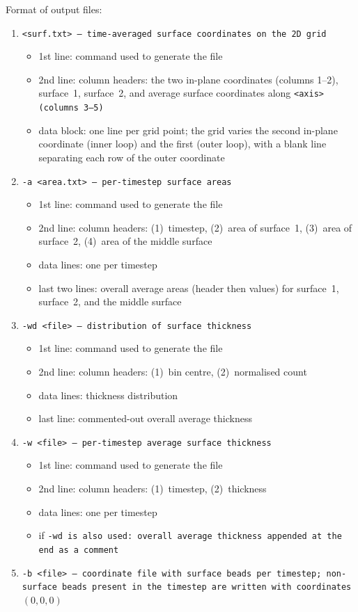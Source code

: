 \noindent
Format of output files:
\begin{enumerate}[nosep,leftmargin=20pt]
  \item \tt{<surf.txt>} --- time-averaged surface coordinates on the 2D grid
    \begin{itemize}[nosep,leftmargin=5pt]
      \item 1st line: command used to generate the file
      \item 2nd line: column headers:
        the two in-plane coordinates (columns 1--2), surface~1, surface~2,
        and average surface coordinates along \tt{<axis>} (columns 3--5)
      \item data block: one line per grid point; the grid varies the second
        in-plane coordinate (inner loop) and the first (outer loop), with a
        blank line separating each row of the outer coordinate
    \end{itemize}
  \item \tt{-a <area.txt>} --- per-timestep surface areas
    \begin{itemize}[nosep,leftmargin=5pt]
      \item 1st line: command used to generate the file
      \item 2nd line: column headers: (1)~timestep, (2)~area of surface~1,
        (3)~area of surface~2, (4)~area of the middle surface
      \item data lines: one per timestep
      \item last two lines: overall average areas (header then values) for
        surface~1, surface~2, and the middle surface
    \end{itemize}
  \item \tt{-wd <file>} --- distribution of surface thickness
    \begin{itemize}[nosep,leftmargin=5pt]
      \item 1st line: command used to generate the file
      \item 2nd line: column headers: (1)~bin centre, (2)~normalised count
      \item data lines: thickness distribution
      \item last line: commented-out overall average thickness
    \end{itemize}
  \item \tt{-w <file>} --- per-timestep average surface thickness
    \begin{itemize}[nosep,leftmargin=5pt]
      \item 1st line: command used to generate the file
      \item 2nd line: column headers: (1)~timestep, (2)~thickness
      \item data lines: one per timestep
      \item if \tt{-wd} is also used: overall average thickness appended at the
        end as a comment
    \end{itemize}
  \item \tt{-b <file>} --- coordinate file with surface beads per timestep;
    non-surface beads present in the timestep are written with coordinates
    $(0, 0, 0)$
\end{enumerate}
